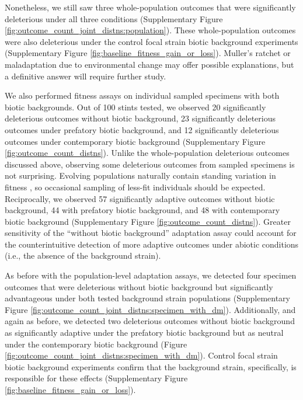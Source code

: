 Nonetheless, we still saw three whole-population outcomes that were significantly deleterious under all three conditions (Supplementary Figure \ref{fig:outcome_count_joint_distns:population}).
These whole-population outcomes were also deleterious under the control focal strain biotic background experiments (Supplementary Figure \ref{fig:baseline_fitness_gain_or_loss}).
Muller's ratchet \citep{andersson1996muller} or maladaptation due to environmental change \citep{brady2019causes} may offer possible explanations, but a definitive answer will require further study.

We also performed fitness assays on individual sampled specimens with both biotic backgrounds.
Out of 100 stints tested, we observed 20 significantly deleterious outcomes without biotic background, 23 significantly deleterious outcomes under prefatory biotic background, and 12 significantly deleterious outcomes under contemporary biotic background (Supplementary Figure \ref{fig:outcome_count_distns}).
Unlike the whole-population deleterious outcomes discussed above, observing some deleterious outcomes from sampled specimens is not surprising.
Evolving populations naturally contain standing variation in fitness \citep{martin2016nonstationary}, so occasional sampling of less-fit individuals should be expected.
Reciprocally, we observed 57 significantly adaptive outcomes without biotic background, 44 with prefatory biotic background, and 48 with contemporary biotic background (Supplementary Figure \ref{fig:outcome_count_distns}).
Greater sensitivity of the ``without biotic background'' adaptation assay could account for the counterintuitive detection of more adaptive outcomes under abiotic conditions (i.e., the absence of the background strain).

As before with the population-level adaptation assays, we detected four specimen outcomes that were deleterious without biotic background but significantly advantageous under both tested background strain populations (Supplementary Figure \ref{fig:outcome_count_joint_distns:specimen_with_dm}).
Additionally, and again as before, we detected two deleterious outcomes without biotic background as significantly adaptive under the prefatory biotic background but as neutral under the contemporary biotic background (Figure \ref{fig:outcome_count_joint_distns:specimen_with_dm}).
Control focal strain biotic background experiments confirm that the background strain, specifically, is responsible for these effects (Supplementary Figure \ref{fig:baseline_fitness_gain_or_loss}).

